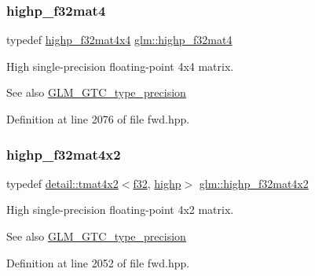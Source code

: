 \subsubsection{\texorpdfstring{highp\+\_\+f32mat4}{highp\_f32mat4}}
{\footnotesize\ttfamily typedef \hyperlink{group__gtc__type__precision_gafe24f12e4f5453058caea3f583ad7d9c}{highp\+\_\+f32mat4x4} \hyperlink{group__gtc__type__precision_gac14c1bfb647e39d459c7489ede2156cc}{glm\+::highp\+\_\+f32mat4}}

High single-\/precision floating-\/point 4x4 matrix. \begin{DoxySeeAlso}{See also}
\hyperlink{group__gtc__type__precision}{G\+L\+M\+\_\+\+G\+T\+C\+\_\+type\+\_\+precision} 
\end{DoxySeeAlso}


Definition at line 2076 of file fwd.\+hpp.

\mbox{\label{group__gtc__type__precision_ga4d799497b303c2434fe709f81f6bd4dd}} 
\subsubsection{\texorpdfstring{highp\+\_\+f32mat4x2}{highp\_f32mat4x2}}
{\footnotesize\ttfamily typedef \hyperlink{structglm_1_1detail_1_1tmat4x2}{detail\+::tmat4x2}$<$\hyperlink{group__gtc__type__precision_ga0ec999b57f5330d9021256e96038df04}{f32}, \hyperlink{namespaceglm_a0f04f086094c747d227af4425893f545ac6f7eab42eacbb10d59a58e95e362074}{highp}$>$ \hyperlink{group__gtc__type__precision_ga4d799497b303c2434fe709f81f6bd4dd}{glm\+::highp\+\_\+f32mat4x2}}

High single-\/precision floating-\/point 4x2 matrix. \begin{DoxySeeAlso}{See also}
\hyperlink{group__gtc__type__precision}{G\+L\+M\+\_\+\+G\+T\+C\+\_\+type\+\_\+precision} 
\end{DoxySeeAlso}


Definition at line 2052 of file fwd.\+hpp.

\mbox{\label{group__gtc__type__precision_ga5bd692575886422f501a379386e391d9}} 

